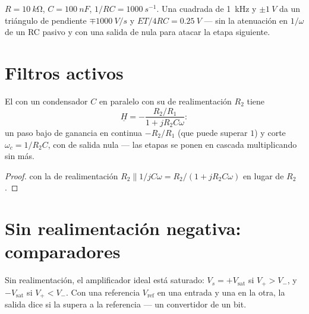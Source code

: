 \begin{example}\label{ex:b1:operational-amplifier:triangle}
$R = \qty{10}{k\ohm}$, $C = \qty{100}{nF}$, $1/RC = \qty{1000}{s^{-1}}$.
Una  cuadrada de \qty{1}{kHz} y $\pm\qty{1}{V}$ da un triángulo de
pendiente $\mp\qty{1000}{V/s}$ y  $ET/4RC = \qty{0.25}{V}$ --- sin
la atenuación en $1/\omega$ de un RC pasivo y con una salida de 
nula para atacar la etapa siguiente.
\end{example}

\section{Filtros activos}

\begin{proposition}\label{prop:b1:operational-amplifier:activelp}
El  con un condensador $C$ en paralelo con su
 de realimentación $R_2$ tiene
\[
\underline H = -\frac{R_2/R_1}{1 + jR_2C\omega}:
\]
un paso bajo de ganancia en continua $-R_2/R_1$ (que puede superar $1$) y
corte $\omega_c = 1/R_2C$, con  de salida nula --- las etapas se
ponen en cascada multiplicando sin más.
\end{proposition}

\begin{proof}
 con la  de realimentación $R_2 \parallel 1/jC\omega
= R_2/(1 + jR_2C\omega)$ en lugar de $R_2$.
\end{proof}

\section{Sin realimentación negativa: comparadores}

\begin{proposition}[Comparador]\label{prop:b1:operational-amplifier:comparator}
Sin realimentación, el amplificador ideal está saturado:
$V_s = +V_{\mathrm{sat}}$ si $V_+ > V_-$, y $-V_{\mathrm{sat}}$ si
$V_+ < V_-$. Con una referencia $V_{\mathrm{ref}}$ en una entrada y una
 en la otra, la salida dice si la  supera a la referencia ---
un convertidor de un bit.
\end{proposition}

